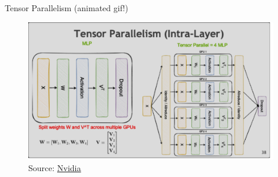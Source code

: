 
\begin{vbframe}{Tensor Parallelism (animated gif!)}

\vfill

\begin{figure}
	\centering
	\includegraphics[width = 11cm]{./figure/tensor_paralel.png} \\ 
	{\footnotesize Source: \href{https://docs.nvidia.com/deeplearning/nemo/user-guide/docs/en/stable/nlp/nemo_megatron/parallelisms.html}{Nvidia}}
\end{figure}

\vfill

\end{vbframe}


%
%
%  
%
%


